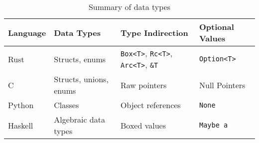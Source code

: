\documentclass[12pt, letterpaper]{article}
\begin{document}
\begin{table}[H]
	\centering
	\begin{tabular}{p{3cm}|p{3cm}|p{3cm}|p{3cm}}
		Language         & Data Types             &
		Type Indirection & Optional Values                                                                                              \\
		\hline
		Rust             & Structs, enums         & \texttt{Box<T>}, \texttt{Rc<T>}, \texttt{Arc<T>}, \texttt{\&T} & \texttt{Option<T>} \\
		\hline
		C                & Structs, unions, enums & Raw pointers                                                   & Null Pointers      \\
		\hline
		Python           & Classes                & Object references                                              & \texttt{None}      \\
		\hline
		Haskell          & Algebraic data types   & Boxed values                                                   & \texttt{Maybe a}   \\
	\end{tabular}
	\caption{Summary of data types}
\end{table}
\end{document}
